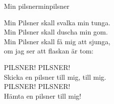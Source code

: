 \begin{song}{Min pilsner}{minpilsner}
\begin{vers}
Min Pilsner skall svalka min tunga.\\
Min Pilsner skall duscha min gom.\\
Min Pilsner skall få mig att sjunga,\\
om jag ser att flaskan är tom:\\
\end{vers}
\begin{vers}
PILSNER! PILSNER!\\
Skicka en pilsner till mig, till mig.\\
PILSNER! PILSNER!\\
Hämta en pilsner till mig!\\
\end{vers}
\end{song}

